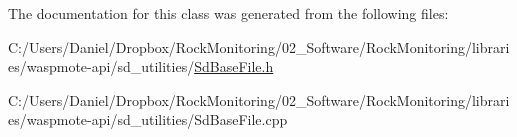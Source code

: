 The documentation for this class was generated from the following files\+:\begin{DoxyCompactItemize}
\item 
C\+:/\+Users/\+Daniel/\+Dropbox/\+Rock\+Monitoring/02\+\_\+\+Software/\+Rock\+Monitoring/libraries/waspmote-\/api/sd\+\_\+utilities/\hyperlink{_sd_base_file_8h}{Sd\+Base\+File.\+h}\item 
C\+:/\+Users/\+Daniel/\+Dropbox/\+Rock\+Monitoring/02\+\_\+\+Software/\+Rock\+Monitoring/libraries/waspmote-\/api/sd\+\_\+utilities/Sd\+Base\+File.\+cpp\end{DoxyCompactItemize}
